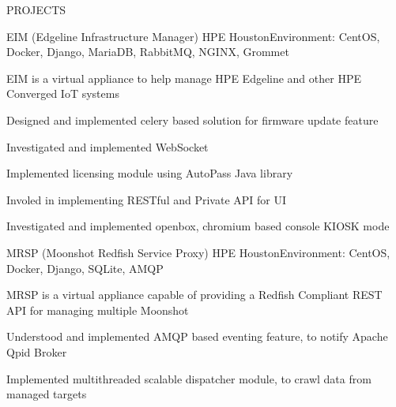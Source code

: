 \documentclass{resume} %
\begin{document}
\begin{rSection}{PROJECTS}


\begin{rSubsection}{EIM (Edgeline Infrastructure Manager)}
{HPE Houston}{Environment: CentOS, Docker, Django,  MariaDB, RabbitMQ, NGINX, Grommet}{ }  %

\vspace{-3pt}

\item EIM is a virtual appliance to help manage HPE Edgeline and other HPE Converged IoT systems
\item Designed and implemented celery based solution for firmware update feature
\item Investigated and implemented WebSocket
\item Implemented licensing module using AutoPass Java library
\item Involed in implementing RESTful and Private API for UI
\item Investigated and implemented openbox, chromium based console KIOSK mode

\end{rSubsection}


\begin{rSubsection}{MRSP (Moonshot Redfish Service Proxy)}
{HPE Houston}{Environment: CentOS, Docker, Django,  SQLite, AMQP}{ }  %

\vspace{-3pt}

\item MRSP is a virtual appliance capable of providing a Redfish Compliant REST API for managing multiple Moonshot
\item Understood and implemented AMQP based eventing feature, to notify Apache Qpid Broker
\item Implemented multithreaded scalable dispatcher module, to crawl data from managed targets

\end{rSubsection}


\end{rSection}
\end{document}
